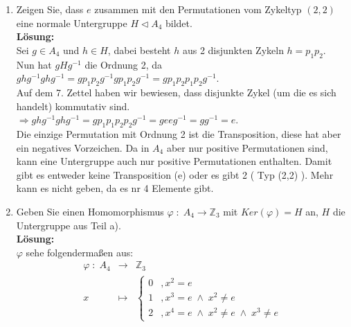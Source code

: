 \documentclass[11pt,a4paper,ngerman]{article}
\begin{document}
\begin{enumerate}[\bfseries a)]
\item Zeigen Sie, dass $e$ zusammen mit den Permutationen vom Zykeltyp $(2,2)$ eine normale Untergruppe $H \vartriangleleft A_4$ bildet.\\

\textbf{Lösung:}\\

Sei $g \in A_4$ und $h \in H$, dabei besteht $h$ aus 2 disjunkten Zykeln $h = p_1p_2$.\\

Nun hat $gHg^{-1}$ die Ordnung 2, da\\
$ghg^{-1}ghg^{-1} = gp_1p_2g^{-1}gp_1p_2g^{-1} = g p_1 p_2 p_1 p_2 g^{-1}$.\\
Auf dem 7. Zettel haben wir bewiesen, dass disjunkte Zykel (um die es sich handelt) kommutativ sind.\\

$\Rightarrow ghg^{-1}ghg^{-1} = g p_1 p_1 p_2 p_2 g^{-1} = g e e g^{-1} = g g^{-1} = e$.\\

Die einzige Permutation mit Ordnung 2 ist die Transposition, diese hat aber ein negatives Vorzeichen. Da in $A_4$ aber nur positive Permutationen sind, kann eine Untergruppe auch nur positive Permutationen enthalten. Damit gibt es entweder keine Transposition (e) oder es gibt 2 ( Typ (2,2) ). Mehr kann es nicht geben, da es nr 4 Elemente gibt.

\item Geben Sie einen Homomorphismus $\varphi \; : \; A_4 \rightarrow \mathbb{Z}_3$ mit $Ker(\varphi ) = H$ an, $H$ die Untergruppe aus Teil a).\\

\textbf{Lösung:}\\

$\varphi$ sehe folgendermaßen aus:
$$
\begin{array}{rcl}
\varphi \; : \; A_4 & \longrightarrow & \mathbb{Z}_3\\
x & \longmapsto & \left\{ 
\begin{array}{lr}
0&,x^2=e\\
1&,x^3=e \; \land \; x^2 \not=e\\
2&,x^4=e \; \land \; x^2 \not=e \; \land \; x^3 \not=e
\end{array}
\right.
\end{array}
$$


\end{enumerate}
\end{document}
